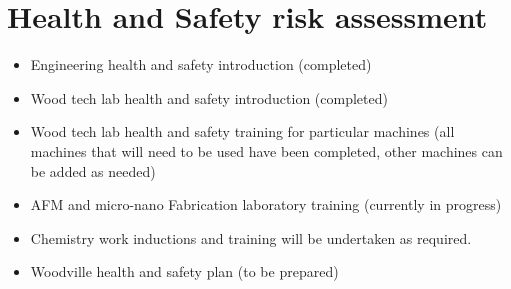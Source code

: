 \chapter{Health and Safety risk assessment}
\begin{itemize}
\item Engineering health and safety introduction (completed)
\end{itemize}

\begin{itemize}
\item Wood tech lab health and safety introduction (completed)
\end{itemize}

\begin{itemize}
\item Wood tech lab health and safety training for particular machines (all machines
that will need to be used have been completed, other machines can be added as
needed)
\end{itemize}

\begin{itemize}
\item AFM and micro-nano Fabrication laboratory training (currently in progress)
\end{itemize}

\begin{itemize}
\item Chemistry work inductions and training will be undertaken as required.
\end{itemize}
\begin{itemize}
\item Woodville health and safety plan (to be prepared)
\end{itemize}
